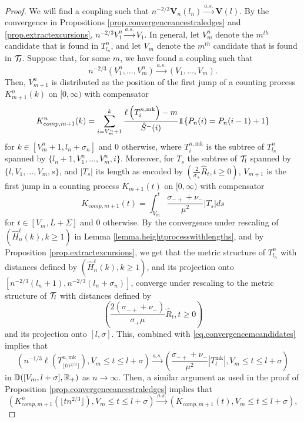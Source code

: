 \begin{proof}
We will find a coupling such that $n^{-2/3}\mathbf{V}_n(l_n)\overset{a.s.}{\to}\mathbf{V}(l).$ By the convergence in Propositions \ref{prop.convergenceancestraledges} and \ref{prop.extractexcursions}, $n^{-2/3}V_1^n\overset{a.s.}{\to}V_1$. In general, let $V_m^n$ denote the $m^{th}$ candidate that is found in $T^n_{l_n}$, and let $V_m$ denote the $m^{th}$ candidate that is found in ${\mathcal T}_l$. Suppose that, for some $m$, we have found a coupling such that 
\begin{equation}\label{eq.convergencemcandidates}n^{-2/3}(V_1^n,\dots,V_m^n)\overset{a.s.}{\to}(V_1,\dots,V_m).\end{equation}
Then, $V_{m+1}^n$ is distributed as the position of the first jump of a counting process $K^n_{m+1}(k)$ on $[0,\infty)$ with compensator 
$$K^n_{comp,m+1}(k)=\sum_{i=V_m^n+1}^k \frac{\ell\left(T^{n,\text{mk}}_{i}\right)-m}{\hat{S}^-(i)}  \one{\left\{P_n(i)=P_n(i-1)+1\right\}}$$
for $k\in [V_m^n+1,l_n+\sigma_n]$ and $0$ otherwise, where $T^{n,\text{mk}}_{i}$ is the subtree of $T^n_{l_n}$ spanned by $\{l_n+1,V^n_1,\dots,V^n_m,i\}$. 
Moreover, for $T_s$ the subtree of ${\mathcal T}_l$ spanned by $\{l,V_1,\dots,V_m, s\}$, and $|T_s|$ its length as encoded by $\left(\frac{2}{\sigma_+}\hat{R}_t,t\geq 0\right)$, $V_{m+1}$ is the first jump in a counting process $K_{m+1}(t)$ on $[0,\infty)$ with compensator 
$$K_{comp,m+1}(t)= \int_{V_m}^t\frac{\sigma_{-+}+\nu_-}{\mu^2}|T_s|ds$$
for $t\in [V_m,L+\Sigma]$ and $0$ otherwise. By the convergence under rescaling of $(\hat{H}^\ell_n(k),k\geq 1)$ in Lemma \ref{lemma.heightprocesswithlengths}, and by Proposition \ref{prop.extractexcursions}, we get that the metric structure of $T^n_{l_n}$ with distances defined by $(\hat{H}^\ell_n(k),k\geq 1)$, and its projection onto $[n^{-2/3}(l_n+1),n^{-2/3}(l_n+\sigma_n)]$, converge under rescaling to the metric structure of ${\mathcal T}_l$ with distances defined by $$\left(\frac{2(\sigma_{-+}+\nu_-)}{\sigma_+\mu}\hat{R}_t,t\geq 0\right)$$ and its projection onto $[l,\sigma]$. This, combined with \eqref{eq.convergencemcandidates} implies that 
$$\left(n^{-1/3}\ell\left(T^{n,\text{mk}}_{\lfloor t n^{2/3}\rfloor}\right),V_m\leq t \leq l+\sigma\right)\overset{a.s.}{\to} \left(\frac{\sigma_{-+}+\nu_-}{\mu^2}|T^{\text{mk}}_t|, V_m\leq t \leq l+\sigma\right)$$ in ${\mathbb D}([V_m,l+\sigma],{\mathbb R}_+)$ as $n\to \infty$. Then, a similar argument as used in the proof of Proposition \ref{prop.convergenceancestraledges} implies that 
$$\left(K^n_{comp,m+1}\left(\lfloor t n^{2/3}\rfloor \right),V_m\leq t \leq l+\sigma\right)\overset{a.s.}{\to}\left(K_{comp,m+1}(t),V_m\leq t \leq l+\sigma\right),$$

\end{proof}
